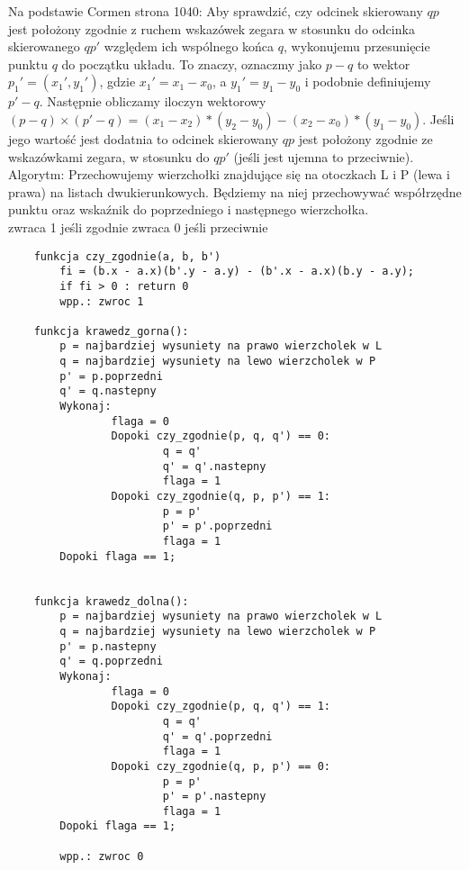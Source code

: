 \documentclass[12pt]{article}
\begin{document}
Na podstawie Cormen strona 1040:
Aby sprawdzić, czy odcinek skierowany $qp$ jest położony zgodnie z ruchem wskazówek zegara w stosunku do odcinka skierowanego $qp'$ względem ich wspólnego końca $q$, wykonujemu przesunięcie punktu $q$ do początku układu. To znaczy, oznaczmy jako $p-q$ to wektor $p_{1}'= (x_{1}', y_{1}')$, gdzie $x_{1}'=x_{1}-x_{0}$, a $y_{1}'=y_{1}-y_{0}$ i podobnie definiujemy $p'-q$. Następnie obliczamy iloczyn wektorowy $(p-q)\times(p'-q)=(x_{1}-x_{2})*(y_{2}-y_{0})-(x_{2}-x_{0})*(y_{1}-y_{0})$. Jeśli jego wartość jest dodatnia to odcinek skierowany $qp$ jest położony zgodnie ze wskazówkami zegara, w stosunku do $qp'$ (jeśli jest ujemna to przeciwnie).\\

Algorytm:
Przechowujemy wierzchołki znajdujące się na otoczkach L i P (lewa i prawa) na listach dwukierunkowych. Będziemy na niej przechowywać współrzędne punktu oraz wskaźnik do poprzedniego i następnego wierzchołka.\\

zwraca 1 jeśli zgodnie
zwraca 0 jeśli przeciwnie
\begin{lstlisting}
    funkcja czy_zgodnie(a, b, b')
        fi = (b.x - a.x)(b'.y - a.y) - (b'.x - a.x)(b.y - a.y);
        if fi > 0 : return 0
        wpp.: zwroc 1

    funkcja krawedz_gorna():
        p = najbardziej wysuniety na prawo wierzcholek w L
        q = najbardziej wysuniety na lewo wierzcholek w P
        p' = p.poprzedni
        q' = q.nastepny
        Wykonaj:    
                flaga = 0
                Dopoki czy_zgodnie(p, q, q') == 0:
                        q = q'
                        q' = q'.nastepny
                        flaga = 1
                Dopoki czy_zgodnie(q, p, p') == 1:
                        p = p'
                        p' = p'.poprzedni
                        flaga = 1        
        Dopoki flaga == 1;
        

    funkcja krawedz_dolna():
        p = najbardziej wysuniety na prawo wierzcholek w L
        q = najbardziej wysuniety na lewo wierzcholek w P
        p' = p.nastepny
        q' = q.poprzedni
        Wykonaj:    
                flaga = 0
                Dopoki czy_zgodnie(p, q, q') == 1:
                        q = q'
                        q' = q'.poprzedni
                        flaga = 1
                Dopoki czy_zgodnie(q, p, p') == 0:
                        p = p'
                        p' = p'.nastepny
                        flaga = 1        
        Dopoki flaga == 1;
        
        wpp.: zwroc 0
\end{lstlisting}
\end{document}
